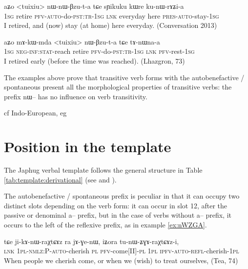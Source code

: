 \documentclass[oldfontcommands,oneside,a4paper,11pt]{article}
\newcommand{\ipa}[1]{{\phon \mbox{#1}}} %
\begin{document}
 \begin{exe}
\ex \label{ex:kunWrAZia}
\gll 
\ipa{aʑo} 	<tuixiu> 	\ipa{nɯ-nɯ-βzu-t-a} 	\ipa{tɕe} 	\ipa{sɲikuku} 	\ipa{kɯre} 	\ipa{ku-nɯ-rɤʑi-a} \\
\textsc{1sg} retire \textsc{pfv-auto}-do-\textsc{pst:tr-1sg} \textsc{lnk} everyday here \textsc{pres-auto}-stay-\textsc{1sg} \\
\glt I retired, and (now) stay (at home) here everyday. (Conversation 2013)
\end{exe} 

 \begin{exe}
\ex \label{ex:tuixiu.nWBzuta}
\gll 
\ipa{aʑo} 	\ipa{mɤ-kɯ-mda} 	<tuixiu> 	\ipa{nɯ-βzu-t-a} \ipa{tɕe} 	\ipa{tɤ-nɯna-a} \\
\textsc{1sg} \textsc{neg-inf:stat}-reach retire \textsc{pfv}-do-\textsc{pst:tr-1sg} \textsc{lnk} \textsc{pfv}-rest-\textsc{1sg} \\
\glt I retired early (before the time was reached). (Lhazgron, 73)
\end{exe} 

The examples above prove that transitive verb forms with the autobenefactive / spontaneous present all the morphological  properties of transitive verbs: the prefix \ipa{nɯ--} has no influence on verb transitivity.

cf Indo-European, eg \citet[19]{pooth14diathesen}

\section{Position in the template}
The Japhug verbal template follows the general structure in Table \ref{tab:template:derivational} (see \citealt{jacques12incorp} and \citealt{jacques13harmonization}). 

The autobenefactive / spontaneous prefix is peculiar in that it can occupy two distinct slots depending on the verb form: it can occur  in slot 12, after the passive or denominal \ipa{a--} prefix, but in the case of verbs without \ipa{a--} prefix, it occurs to the left of the reflexive prefix, as in example \ref{ex:nWZGA}.

\begin{exe}
\ex \label{ex:nWZGA}
\gll 
\ipa{tɕe}  	\ipa{ji-kɤ-nɯ-raχtɕɤz}  	\ipa{ra}  	\ipa{jɤ-ɣe-nɯ,}  	\ipa{iʑora}  	\ipa{tu-nɯ-ʑɣɤ-raχtɕɤz-i,}  \\
\textsc{lnk} \textsc{1pl-nmlz:P-auto}-cherish \textsc{pl} \textsc{pfv}-come[II]-\textsc{pl} \textsc{1pl} \textsc{ipfv-auto-refl}-cherish-\textsc{1pl} \\
\glt When people we cherish come, or when we (wish) to treat ourselves, (Tea, 74)
\end{exe}
\end{document}
